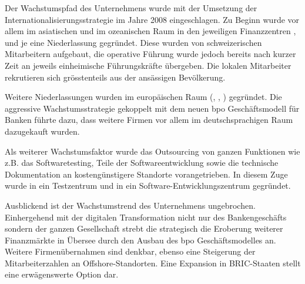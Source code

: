 \begin{sloppypar}
Der Wachstumspfad des Unternehmens wurde mit der Umsetzung der Internationalisierungsstrategie im Jahre 2008 eingeschlagen. Zu Beginn wurde vor allem im asiatischen und im ozeanischen Raum in den jeweiligen Finanzzentren \companybranchSEASIA, \companybranchCHINA und \companybranchOCEANIA je eine Niederlassung gegründet. Diese wurden von schweizerischen Mitarbeitern aufgebaut, die operative Führung wurde jedoch bereits nach kurzer Zeit an jeweils einheimische Führungskräfte übergeben. Die lokalen Mitarbeiter rekrutieren sich grösstenteils aus der ansässigen Bevölkerung.

Weitere Niederlassungen wurden im europäischen Raum (\companybranchFRANCE, \companybranchUK, \companybranchBENELUX) gegründet. Die aggressive Wachstumsstrategie gekoppelt mit dem neuen \acrfull{bpo} Geschäftsmodell für Banken führte dazu, dass weitere Firmen vor allem im deutschsprachigen Raum dazugekauft wurden.

Als weiterer Wachstumsfaktor wurde das Outsourcing von ganzen Funktionen wie z.B. das Softwaretesting, Teile der Softwareentwicklung sowie die technische Dokumentation an kostengünstigere Standorte vorangetrieben. In diesem Zuge wurde in \companyopscenterSEASIA ein Testzentrum und in \companydevcenterEU ein Software-Entwicklungszentrum gegründet.

Ausblickend ist der Wachstumstrend des Unternehmens ungebrochen. Einhergehend mit der digitalen Transformation nicht nur des Bankengeschäfts sondern der ganzen Gesellschaft strebt die \companyshort{} strategisch die Eroberung weiterer Finanzmärkte in Übersee durch den Ausbau des \acrlong{bpo} Geschäftsmodelles an. Weitere Firmenübernahmen sind denkbar, ebenso eine Steigerung der Mitarbeiterzahlen an Offshore-Standorten. Eine Expansion in BRIC-Staaten stellt eine erwägenswerte Option dar.
\end{sloppypar}

